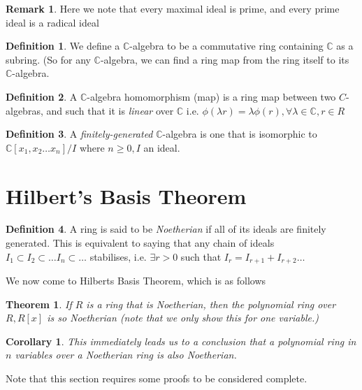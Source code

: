 \documentclass[12pt]{book}
\newtheorem{theorem}{Theorem}[chapter]
\newtheorem{corollary}{Corollary}[theorem]
\theoremstyle{definition}
\newtheorem*{definition}{Definition}
\newtheorem*{remark}{Remark}
\begin{document}
\begin{remark}
    Here we note that every maximal ideal is prime, and every prime ideal is a radical ideal
\end{remark}
\begin{definition}
    We define a $\mathbb{C}$-algebra to be a commutative ring containing $\mathbb{C}$ as a subring. (So for any $\mathbb{C}$-algebra, we can find a ring map from the ring itself to its $\mathbb{C}$-algebra.
\end{definition}
\begin{definition}
    A $\mathbb{C}$-algebra homomorphism (map) is a ring map between two $C$-algebras, and such that it is \textit{linear} over $\mathbb{C}$ i.e. $\phi(\lambda r) = \lambda\phi(r), \forall \lambda \in \mathbb{C}, r \in R$
\end{definition}
\begin{definition}
    A \textit{finitely-generated} $\mathbb{C}$-algebra is one that is isomorphic to $\mathbb{C}[x_1,x_2\ldots x_n]/I$ where $n \geq 0, I$ an ideal.
\end{definition}
\section{Hilbert's Basis Theorem}
\begin{definition}
    A ring is said to be \textit{Noetherian} if all of its ideals are finitely generated. This is equivalent to saying that any chain of ideals $I_1 \subset I_2 \subset \ldots I_n \subset \ldots$ stabilises, i.e. $\exists r > 0$ such that $I_r = I_{r + 1} + I_{r+2} \ldots$
\end{definition}
We now come to Hilberts Basis Theorem, which is as follows
\begin{theorem}
    If $R$ is a ring that is Noetherian, then the polynomial ring over $R, R[x]$ is so Noetherian (note that we only show this for one variable.)
\end{theorem}
\begin{corollary}
    This immediately leads us to a conclusion that a polynomial ring in $n$ variables over a Noetherian ring is also Noetherian.
\end{corollary}
Note that this section requires some proofs to be considered complete. 
\end{document}
